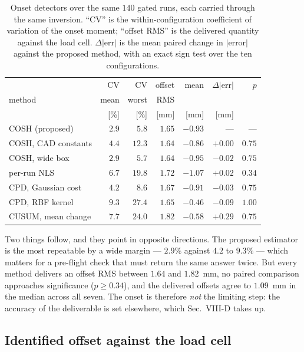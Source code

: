 \begin{table}[t]
\centering
\caption{Onset detectors over the same $140$ gated runs, each carried
through the same inversion. ``CV'' is the within-configuration
coefficient of variation of the onset moment; ``offset RMS'' is the
delivered quantity against the load cell. $\Delta|$err$|$ is the mean
paired change in $|$error$|$ against the proposed method, with an
exact sign test over the ten configurations.}
\label{tab:bench}
\small
\setlength{\tabcolsep}{4pt}
\begin{tabular}{@{}l rr rr rr@{}}
\hline
 & CV & CV & offset & mean & $\Delta|$err$|$ & $p$ \\
method & mean & worst & RMS & & & \\
 & [\%] & [\%] & [mm] & [mm] & [mm] & \\
\hline
COSH (proposed)      & $2.9$ & $5.8$  & $1.65$ & $-0.93$ & ---     & --- \\
COSH, CAD constants  & $4.4$ & $12.3$ & $1.64$ & $-0.86$ & $+0.00$ & $0.75$\\
COSH, wide box       & $2.9$ & $5.7$  & $1.64$ & $-0.95$ & $-0.02$ & $0.75$\\
per-run NLS          & $6.7$ & $19.8$ & $1.72$ & $-1.07$ & $+0.02$ & $0.34$\\
CPD, Gaussian cost   & $4.2$ & $8.6$  & $1.67$ & $-0.91$ & $-0.03$ & $0.75$\\
CPD, RBF kernel      & $9.3$ & $27.4$ & $1.65$ & $-0.46$ & $-0.09$ & $1.00$\\
CUSUM, mean change   & $7.7$ & $24.0$ & $1.82$ & $-0.58$ & $+0.29$ & $0.75$\\
\hline
\end{tabular}
\end{table}

Two things follow, and they point in opposite directions. The proposed
estimator is the most repeatable by a wide margin --- $2.9\%$ against
$4.2$ to $9.3\%$ --- which matters for a pre-flight check that must
return the same answer twice. But every method delivers an offset RMS
between $1.64$ and $1.82$~mm, no paired comparison approaches
significance ($p\ge0.34$), and the delivered offsets agree to
$1.09$~mm in the median across all seven. The onset is therefore
\emph{not} the limiting step: the accuracy of the deliverable is set
elsewhere, which Sec.~VIII-D takes up.

\subsection{Identified offset against the load cell}

